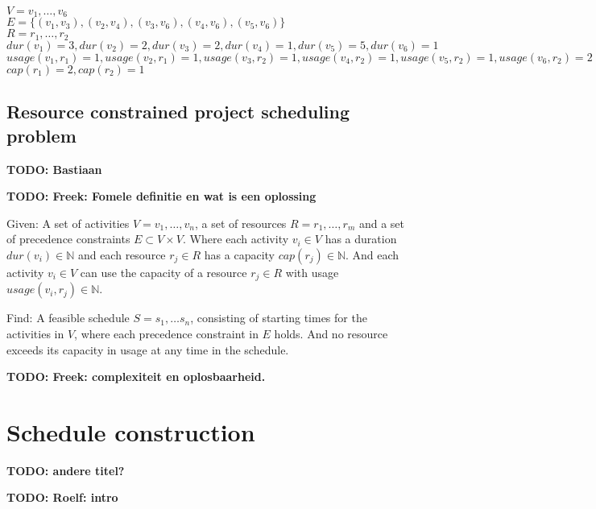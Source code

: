 \documentclass{article}
\newcommand{\TODO}[1]{{\color{red}\textbf{TODO: #1}}}
\newcommand{\capa}[1]{\ensuremath{cap(r_{#1})}} %
\newcommand{\dur}[1]{\ensuremath{dur(v_{#1})}} %
\newcommand{\usage}[2]{\ensuremath{usage(v_{#1}, r_{#2})}} %
\newenvironment{definition}[1][Definition]{\begin{trivlist}
\item[\hskip \labelsep {\bfseries #1}]}{\end{trivlist}}
\begin{document}
$V = v_1, \ldots, v_6$\\
$E = \{(v_1, v_3), (v_2, v_4), (v_3, v_6), (v_4, v_6), (v_5, v_6)\}$\\
$R = r_1, \ldots, r_2$\\
$\dur{1} = 3, \dur{2} = 2, \dur{3} = 2, \dur{4} = 1, \dur{5} = 5, \dur{6} = 1$\\
$\usage{1}{1} = 1, \usage{2}{1} = 1, \usage{3}{2} = 1, \usage{4}{2} = 1, \usage{5}{2} = 1, \usage{6}{2} = 2$\\
$\capa{1} = 2, \capa{2} = 1$


\subsection{Resource constrained project scheduling problem}

\TODO{Bastiaan}


\TODO{Freek: Fomele definitie en wat is een oplossing}

\begin{definition}
Given:
A set of activities $V = v_1, \ldots, v_n$, a set of resources $R = r_1, \ldots, r_m$ and a set of precedence constraints $E \subset V \times V$.
Where each activity $v_i \in V$ has a duration $\dur{i} \in \mathbb{N}$ and each resource $r_j \in R$ has a capacity $\capa{j} \in \mathbb{N}$. 
And each activity $v_i \in V$ can use the capacity of a resource $r_j \in R$ with usage $\usage{i}{j} \in \mathbb{N}$.

Find:
A feasible schedule $S = s_1, \ldots s_n$, consisting of starting times for the activities in $V$, where each precedence constraint in $E$ holds.
And no resource exceeds its capacity in usage at any time in the schedule.
\end{definition}


\TODO{Freek: complexiteit en oplosbaarheid.}


\newpage


\section{Schedule construction} \TODO{andere titel?}

\TODO{Roelf: intro}
\end{document}
